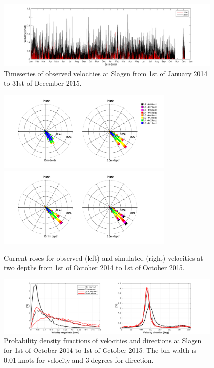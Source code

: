 \documentclass[12pt,a4paper,english]{article}
\begin{document}
\begin{figure}[ht]
\centerline{
\includegraphics*[trim=3cm 0cm 3cm 0cm,clip=true,width=\textwidth]{Figurer/Slagen_tid}}
\caption{\small
Timeseries of observed velocities at Slagen from 1st of January 2014 to 31st of December 2015.}
\label{fig:Slagen-tid}
\end{figure}

\begin{figure}[ht]
\centerline{
\includegraphics*[trim=2cm 1cm 1cm 0cm,clip=true,height=4cm]{Figurer/Slagen_Rose_obs} 
\includegraphics*[trim=2cm 1cm 3cm 0cm,clip=true,height=4cm]{Figurer/Slagen_Rose_sim}
}
\caption{\small
Current roses for observed (left) and simulated (right) velocities at two depths from 1st of October 2014 to 1st of October 2015.}
\label{fig:Slagen-rose}
\end{figure}

\begin{figure}[t]
\centerline{
\includegraphics*[trim=3cm 0cm 3cm 0cm,clip=true,width=\textwidth]{Figurer/Slagen_pdf} 
}
\caption{\small
Probability density functions of velocities and directions at Slagen for 1st of October 2014 to 1st of October 2015. The bin width is 0.01 knots for velocity and 3 degrees for direction.}
\label{fig:Slagen-pdf}
\end{figure}
\end{document}
